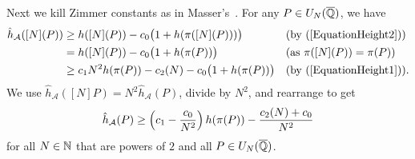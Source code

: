 Next we kill Zimmer constants as in
Masser's~\cite[Appendix~C]{ZannierBook}.
For any $P\in U_N({\overline{\mathbb{Q}}})$, we have
\begin{align*}
\hat{h}_{\mathcal{A}}([N](P)) &\ge h([N](P))
-c_0\bigl(1+h(\pi([N](P)))\bigr) 
&&\text{(by (\ref{EquationHeight2}))}\\
&= h([N](P))
-c_0\bigl(1+h(\pi(P))\bigr)
&&\text{(as $\pi([N](P))=\pi(P)$)}
\\
&\ge c_1 N^2 h(\pi(P)) -c_2(N) -c_0\bigl(1+h(\pi(P))\bigr)
&&\text{(by (\ref{EquationHeight1})).}
\end{align*}
We use $\hat{h}_{\mathcal{A}}([N]P)=N^2 \hat{h}_{\mathcal{A}}(P)$, 
divide by $N^2$, and rearrange to get
\begin{equation*}%
\hat{h}_{\cA}(P) \ge \left(c_1 - \frac{c_0}{N^2} \right) h(\pi(P)) - \frac{c_2(N)+ c_0}{N^2}
\end{equation*}
for all $N\in{\mathbb{N}}$ that are powers of $2$  and all $P \in U_N({\overline{\mathbb{Q}}})$. 


